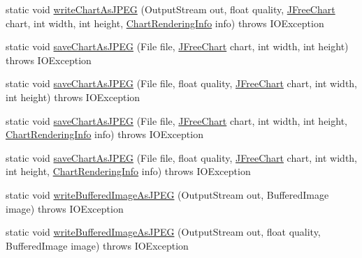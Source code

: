 \begin{DoxyCompactItemize}
\item 
static void \mbox{\hyperlink{classorg_1_1jfree_1_1chart_1_1_chart_utilities_a3620c043543938b36ce1d67b9375336a}{write\+Chart\+As\+J\+P\+EG}} (Output\+Stream out, float quality, \mbox{\hyperlink{classorg_1_1jfree_1_1chart_1_1_j_free_chart}{J\+Free\+Chart}} chart, int width, int height, \mbox{\hyperlink{classorg_1_1jfree_1_1chart_1_1_chart_rendering_info}{Chart\+Rendering\+Info}} info)  throws I\+O\+Exception 
\item 
static void \mbox{\hyperlink{classorg_1_1jfree_1_1chart_1_1_chart_utilities_a37bf68397ff8ebb142b108fdd46d1653}{save\+Chart\+As\+J\+P\+EG}} (File file, \mbox{\hyperlink{classorg_1_1jfree_1_1chart_1_1_j_free_chart}{J\+Free\+Chart}} chart, int width, int height)  throws I\+O\+Exception 
\item 
static void \mbox{\hyperlink{classorg_1_1jfree_1_1chart_1_1_chart_utilities_ad0fc69d4f06c0393d155394d09cc99d5}{save\+Chart\+As\+J\+P\+EG}} (File file, float quality, \mbox{\hyperlink{classorg_1_1jfree_1_1chart_1_1_j_free_chart}{J\+Free\+Chart}} chart, int width, int height)  throws I\+O\+Exception 
\item 
static void \mbox{\hyperlink{classorg_1_1jfree_1_1chart_1_1_chart_utilities_a9ef29a563e89e0fcac68ea9621cb455f}{save\+Chart\+As\+J\+P\+EG}} (File file, \mbox{\hyperlink{classorg_1_1jfree_1_1chart_1_1_j_free_chart}{J\+Free\+Chart}} chart, int width, int height, \mbox{\hyperlink{classorg_1_1jfree_1_1chart_1_1_chart_rendering_info}{Chart\+Rendering\+Info}} info)  throws I\+O\+Exception 
\item 
static void \mbox{\hyperlink{classorg_1_1jfree_1_1chart_1_1_chart_utilities_a0d474bec9117331e340ff60b19dde153}{save\+Chart\+As\+J\+P\+EG}} (File file, float quality, \mbox{\hyperlink{classorg_1_1jfree_1_1chart_1_1_j_free_chart}{J\+Free\+Chart}} chart, int width, int height, \mbox{\hyperlink{classorg_1_1jfree_1_1chart_1_1_chart_rendering_info}{Chart\+Rendering\+Info}} info)  throws I\+O\+Exception 
\item 
static void \mbox{\hyperlink{classorg_1_1jfree_1_1chart_1_1_chart_utilities_ac01c0b8e035f6caebce4f550d63cf3cb}{write\+Buffered\+Image\+As\+J\+P\+EG}} (Output\+Stream out, Buffered\+Image image)  throws I\+O\+Exception 
\item 
static void \mbox{\hyperlink{classorg_1_1jfree_1_1chart_1_1_chart_utilities_a225d7e9ec5bb810f415f1d92aec786c1}{write\+Buffered\+Image\+As\+J\+P\+EG}} (Output\+Stream out, float quality, Buffered\+Image image)  throws I\+O\+Exception 
\item 

\end{DoxyCompactItemize}
